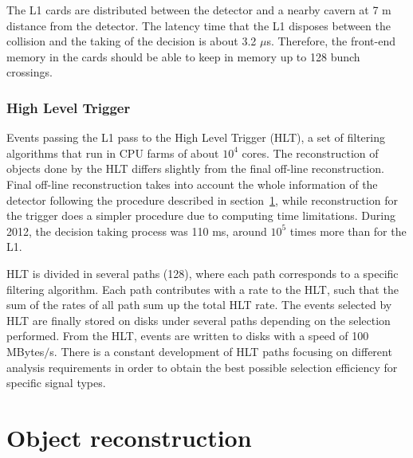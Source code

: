The L1 cards are distributed between the detector and a nearby cavern at 7 m distance from the detector. The latency time that the L1 disposes between the collision and the taking of the decision is about 3.2 $\mu$s. Therefore, the front-end memory in the cards should be able to keep in memory up to 128 bunch crossings. 

\subsubsection{High Level Trigger}
\label{sec:HLT}


Events passing the L1 pass to the High Level Trigger (HLT), a set of filtering algorithms that run in CPU farms of about $10^{4}$ cores. The reconstruction of objects done by the HLT differs slightly from the final off-line reconstruction. Final off-line reconstruction takes into account the whole information of the detector following the procedure described in section~\ref{sec:reco}, while reconstruction for the trigger does a simpler procedure due to computing time limitations. During 2012, the decision taking process was 110 ms, around $10^{5}$ times more than for the L1. 

HLT is divided in several paths (128), where each path corresponds to a specific filtering algorithm. Each path contributes with a rate to the HLT, such that the sum of the rates of all path sum up the total HLT rate. The events selected by HLT are finally stored on disks under several paths depending on the selection performed. From the HLT, events are written to disks with a speed of 100 MBytes$/$s. There is a constant development of HLT paths focusing on different analysis requirements in order to obtain the best possible selection efficiency for specific signal types. 

\section{Object reconstruction}
\label{sec:reco}

